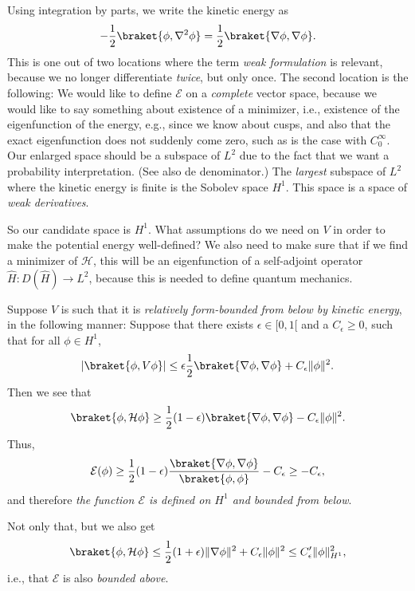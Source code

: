 Using integration by parts, we write the kinetic energy as
\begin{equation}
    -\frac{1}{2}\braket{\phi,\nabla^2\phi} = \frac{1}{2} \braket{\nabla\phi,\nabla\phi}.
\end{equation}
This is one out of two locations where the term \emph{weak formulation} is relevant, because we no longer differentiate \emph{twice}, but only once. The second location is the following: We would like to define $\mathcal{E}$ on a \emph{complete} vector space, because we would like to say something about existence of a minimizer, i.e., existence of the eigenfunction of the energy, e.g., since we know about cusps, and also that the exact eigenfunction does not suddenly come zero, such as is the case with $C^\infty_0$. Our enlarged space should be a subspace of $L^2$ due to the fact that we want a probability interpretation. (See also de denominator.) The \emph{largest} subspace of $L^2$ where the kinetic energy is finite is the Sobolev space $H^1$. This space is a space of \emph{weak derivatives}.

So our candidate space is $H^1$. What assumptions do we need on $V$ in order to make the potential energy well-defined? We also need to make sure that if we find a minimizer of $\mathcal{H}$, this will be an eigenfunction of a self-adjoint operator $\hat{H} : D(\hat{H}) \to L^2$, because this is needed to define quantum mechanics.

Suppose $V$ is such that it is \emph{relatively form-bounded from below by kinetic energy}, in the following manner: Suppose that there exists $\epsilon  \in[0,1[$ and a $C_\epsilon \geq 0$, such that for all $\phi\in H^1$,
\begin{equation} \label{eq:form-bounded}
    |\braket{\phi,V\phi}| \leq \epsilon \frac{1}{2}\braket{\nabla\phi,\nabla\phi} + C_\epsilon \|\phi\|^2.
\end{equation}
Then we see that
\begin{equation}
    \braket{\phi,\mathcal{H}\phi} \geq \frac{1}{2}(1-\epsilon) \braket{\nabla\phi,\nabla\phi} - C_\epsilon \|\phi\|^2.
\end{equation}
Thus,
\begin{equation}
    \mathcal{E}(\phi) \geq \frac{1}{2}(1-\epsilon) \frac{\braket{\nabla\phi,\nabla\phi}}{\braket{\phi,\phi}} - C_\epsilon  \geq - C_\epsilon,
\end{equation}
and therefore \emph{the function $\mathcal{E}$ is defined on $H^1$ and bounded from below}.

Not only that, but we also get
\begin{equation}
    \braket{\phi,\mathcal{H}\phi} \leq \frac{1}{2}(1 + \epsilon)\|\nabla\phi\|^2 + C_\epsilon \|\phi\|^2 \leq C_\epsilon'\|\phi\|_{H^1}^2,
\end{equation}
i.e., that $\mathcal{E}$ is also \emph{bounded above}.

